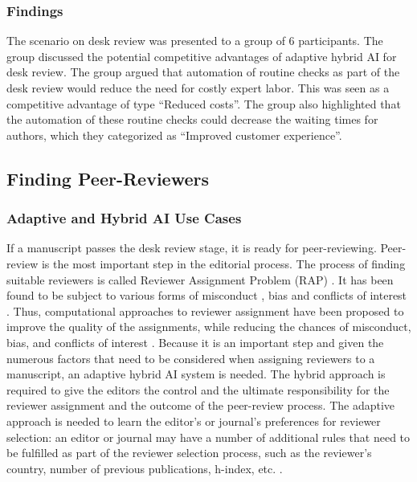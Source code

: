 \subsubsection*{Findings}

The scenario on desk review was presented to a group of 6 participants. The group discussed the potential competitive advantages of
adaptive hybrid AI for desk review. The group argued that automation of routine checks as part of the desk review would reduce the
need for costly expert labor. This was seen as a competitive advantage of type ``Reduced costs''. The group also highlighted that 
the automation of these routine checks could decrease the waiting times for authors, which they categorized as ``Improved customer
experience''.


\subsection{Finding Peer-Reviewers}

\subsubsection*{Adaptive and Hybrid AI Use Cases}

If a manuscript passes the desk review stage, it is ready for peer-reviewing. Peer-review is the most important step in the editorial 
process. The process of finding suitable reviewers is called Reviewer Assignment Problem (RAP) \citep{mittalUnderstandingReviewerAssignment2019}.
It has been found to be subject to various forms of misconduct \citep{marcovitchMisconductResearchersAuthors2007}, bias \citep{leeBiasPeerReview2013}
and conflicts of interest \citep{resnikConflictInterestJournal2018}. Thus, computational approaches to reviewer assignment have been
proposed to improve the quality of the assignments, while reducing the chances of misconduct, bias, and conflicts of interest
\citep{shahChallengesExperimentsComputational2022}. Because it is an important step and given the numerous factors that need to be considered
when assigning reviewers to a manuscript, an adaptive hybrid AI system is needed. The hybrid approach is required to give the editors the
control and the ultimate responsibility for the reviewer assignment and the outcome of the peer-review process. The adaptive approach is
needed to learn the editor's or journal's preferences for reviewer selection: an editor or journal may have a number of additional rules 
that need to be fulfilled as part of the reviewer selection process, such as the reviewer's country, number of previous publications, 
h-index, etc. \citep[p.~8]{rordorfHybridIntelligentApproach2023}.

